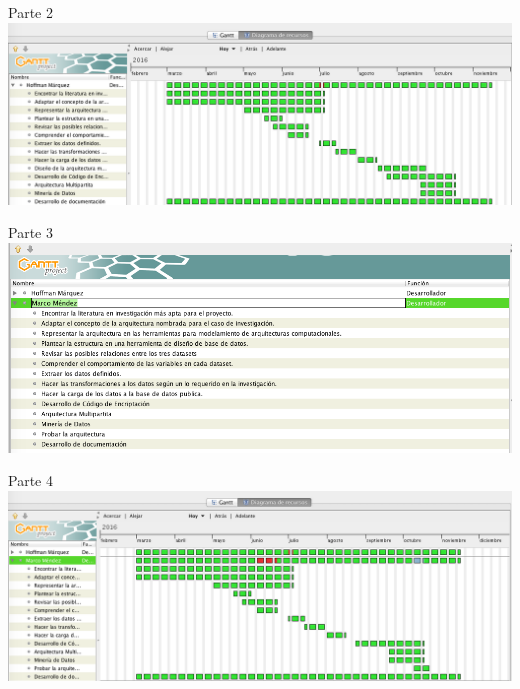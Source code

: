 \documentclass[a4paper, 11pt, oneside]{article}
\theoremstyle{definition}
\theoremstyle{remark}
\begin{document}
\begin{table}
\begin{center}
Parte 2
\includegraphics[width=\textwidth]{Hoffma2.png}
\end{center}
\end{table}
\clearpage

\begin{table}
\begin{center}
Parte 3
\includegraphics[width=\textwidth]{Marco1.png}
\end{center}
\end{table}
\clearpage

\begin{table}
\begin{center}
Parte 4
\includegraphics[width=\textwidth]{Marco2.png}
\end{center}
\end{table}
\clearpage

\clearpage
\end{document}
